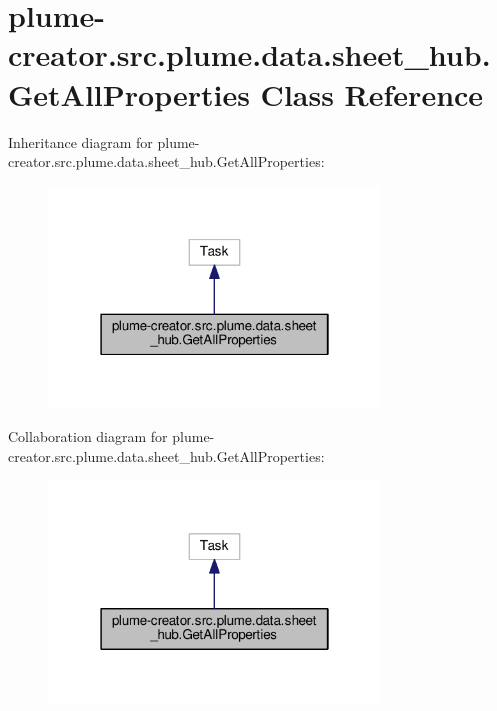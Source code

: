 \hypertarget{classplume-creator_1_1src_1_1plume_1_1data_1_1sheet__hub_1_1_get_all_properties}{}\section{plume-\/creator.src.\+plume.\+data.\+sheet\+\_\+hub.\+Get\+All\+Properties Class Reference}
\label{classplume-creator_1_1src_1_1plume_1_1data_1_1sheet__hub_1_1_get_all_properties}


Inheritance diagram for plume-\/creator.src.\+plume.\+data.\+sheet\+\_\+hub.\+Get\+All\+Properties\+:\nopagebreak
\begin{figure}[H]
\begin{center}
\leavevmode
\includegraphics[width=250pt]{classplume-creator_1_1src_1_1plume_1_1data_1_1sheet__hub_1_1_get_all_properties__inherit__graph}
\end{center}
\end{figure}


Collaboration diagram for plume-\/creator.src.\+plume.\+data.\+sheet\+\_\+hub.\+Get\+All\+Properties\+:\nopagebreak
\begin{figure}[H]
\begin{center}
\leavevmode
\includegraphics[width=250pt]{classplume-creator_1_1src_1_1plume_1_1data_1_1sheet__hub_1_1_get_all_properties__coll__graph}
\end{center}
\end{figure}

